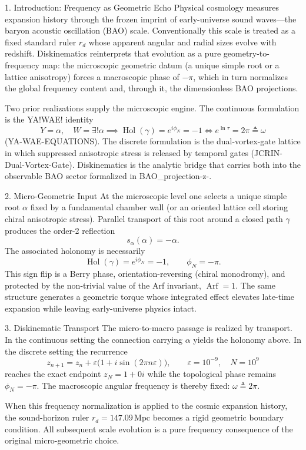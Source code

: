 1. Introduction: Frequency as Geometric Echo
Physical cosmology measures expansion history through the frozen imprint of early-universe sound waves—the baryon acoustic oscillation (BAO) scale. Conventionally this scale is treated as a fixed standard ruler \(r_d\) whose apparent angular and radial sizes evolve with redshift. Diskinematics reinterprets that evolution as a pure geometry-to-frequency map: the microscopic geometric datum (a unique simple root or a lattice anisotropy) forces a macroscopic phase of \(-\pi\), which in turn normalizes the global frequency content and, through it, the dimensionless BAO projections.

Two prior realizations supply the microscopic engine. The continuous formulation is the YA!WAE! identity  
\[
Y=\alpha,\quad W=\exists!\alpha\implies\operatorname{Hol}(\gamma)=e^{i\phi_N}=-1\iff e^{\ln\tau}=2\pi\triangleq\omega
\]  
(YA-WAE-EQUATIONS). The discrete formulation is the dual-vortex-gate lattice in which suppressed anisotropic stress is released by temporal gates (JCRIN-Dual-Vortex-Gate). Diskinematics is the analytic bridge that carries both into the observable BAO sector formalized in BAO_projection-z-.

2. Micro-Geometric Input
At the microscopic level one selects a unique simple root \(\alpha\) fixed by a fundamental chamber wall (or an oriented lattice cell storing chiral anisotropic stress). Parallel transport of this root around a closed path \(\gamma\) produces the order-2 reflection  
\[
s_\alpha(\alpha)=-\alpha.
\]  
The associated holonomy is necessarily  
\[
\operatorname{Hol}(\gamma)=e^{i\phi_N}=-1,\qquad\phi_N=-\pi.
\]  
This sign flip is a Berry phase, orientation-reversing (chiral monodromy), and protected by the non-trivial value of the Arf invariant, \(\operatorname{Arf}=1\). The same structure generates a geometric torque whose integrated effect elevates late-time expansion while leaving early-universe physics intact.

3. Diskinematic Transport
The micro-to-macro passage is realized by transport. In the continuous setting the connection carrying \(\alpha\) yields the holonomy above. In the discrete setting the recurrence  
\[
z_{n+1}=z_n+\varepsilon\bigl(1+i\sin(2\pi n\varepsilon)\bigr),\qquad\varepsilon=10^{-9},\quad N=10^9
\]  
reaches the exact endpoint \(z_N=1+0i\) while the topological phase remains \(\phi_N=-\pi\). The macroscopic angular frequency is thereby fixed: \(\omega\triangleq2\pi\).

When this frequency normalization is applied to the cosmic expansion history, the sound-horizon ruler \(r_d=147.09\,\mathrm{Mpc}\) becomes a rigid geometric boundary condition. All subsequent scale evolution is a pure frequency consequence of the original micro-geometric choice.

